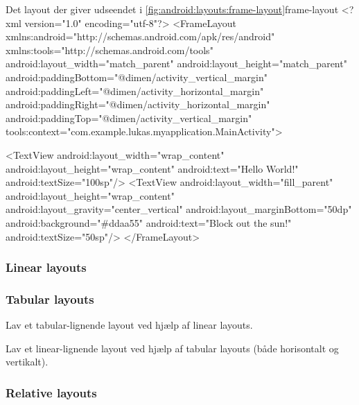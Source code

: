 \begin{XmlCode}{Det layout der giver udseendet i \autoref{fig:android:layouts:frame-layout}}{frame-layout}
	<?xml version="1.0" encoding="utf-8"?>
	<FrameLayout xmlns:android="http://schemas.android.com/apk/res/android"
		xmlns:tools="http://schemas.android.com/tools"
		android:layout_width="match_parent"
		android:layout_height="match_parent"
		android:paddingBottom="@dimen/activity_vertical_margin"
		android:paddingLeft="@dimen/activity_horizontal_margin"
		android:paddingRight="@dimen/activity_horizontal_margin"
		android:paddingTop="@dimen/activity_vertical_margin"
		tools:context="com.example.lukas.myapplication.MainActivity">
	
		<TextView
			android:layout_width="wrap_content"
			android:layout_height="wrap_content"
			android:text="Hello World!"
			android:textSize="100sp"/>
		<TextView
			android:layout_width="fill_parent"
			android:layout_height="wrap_content"
			android:layout_gravity="center_vertical"
			android:layout_marginBottom="50dp"
			android:background="#ddaa55"
			android:text="Block out the sun!"
			android:textSize="50sp"/>
	</FrameLayout>
\end{XmlCode}

\subsubsection{Linear layouts}

\subsubsection{Tabular layouts}

\begin{exercise}
	Lav et tabular-lignende layout ved hjælp af linear layouts.
\end{exercise}

\begin{exercise}
	Lav et linear-lignende layout ved hjælp af tabular layouts (både horisontalt og vertikalt).
\end{exercise}

\subsubsection{Relative layouts}